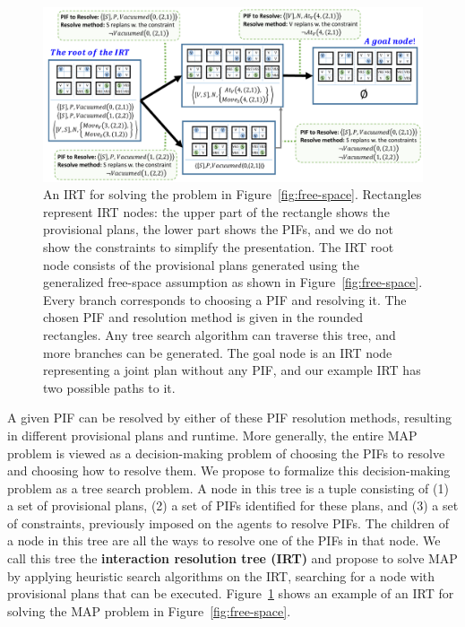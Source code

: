 \documentclass[11pt]{article}
\begin{document}
\begin{figure}%
\centering
\includegraphics[width=0.8\columnwidth]{IRT-example_cropped}%
\vspace{-0.4cm}
\caption{{\small An IRT for solving the problem in Figure~\ref{fig:free-space}. Rectangles represent IRT nodes: the upper part of the rectangle shows the provisional plans, the lower part shows the PIFs, and we do not show the constraints to simplify the presentation. The IRT root node consists of the provisional plans generated using the generalized free-space assumption as shown in Figure~\ref{fig:free-space}. Every branch corresponds to choosing a PIF and resolving it. The chosen PIF and resolution method is given in the rounded rectangles. Any tree search algorithm can traverse this tree, and more branches can be generated. The goal node is an IRT node representing a joint plan without any PIF, and our example IRT has two possible paths to it.}}
\label{fig:irt-example}%
\end{figure}

A given PIF can be resolved by either of these  PIF resolution methods, resulting in different provisional plans and runtime. More generally, the entire MAP problem is viewed as a decision-making problem of choosing the PIFs to resolve and choosing how to resolve them. We propose to formalize this decision-making problem as a tree search problem. A node in this tree is a tuple consisting of (1) a set of provisional plans, (2) a set of PIFs identified for these plans, and (3) a set of constraints, previously imposed on the agents to resolve PIFs. The children of a node in this tree are all the ways to resolve one of the PIFs in that node. 
We call this tree the {\bf interaction resolution tree (IRT)} and propose to solve MAP by applying heuristic search algorithms on the IRT, searching for a node with provisional plans that can be executed. Figure~\ref{fig:irt-example} shows an example of an IRT for solving the MAP problem in Figure~\ref{fig:free-space}. 

\end{document}
